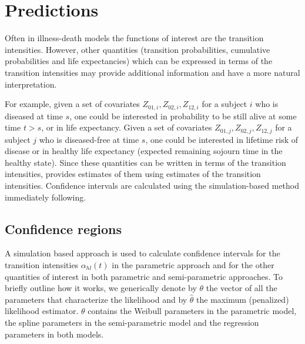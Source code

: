 \documentclass[article]{jss}
\begin{document}
\section{Predictions}
\label{sec-4}

Often in illness-death models the functions of interest are the
transition intensities.  However, other quantities (transition probabilities, cumulative probabilities and life
expectancies) which can be
expressed in terms of the transition intensities \citep{Touraine_2013}
may provide additional information and have a more natural
interpretation.

For example, given a set of covariates \(Z_{01,i},Z_{02,i},Z_{12,i}\)
for a subject \(i\) who is diseased at time \(s\), one could be interested
in probability to be still alive at some time \(t>s\), or in life
expectancy. Given a set of covariates \(Z_{01,j},Z_{02,j},Z_{12,j}\) for
a subject \(j\) who is diseased-free at time \(s\), one could be
interested in lifetime risk of disease or in healthy life expectancy
(expected remaining sojourn time in the healthy state). 
Since these quantities
can be written in terms of the transition intensities,
 provides estimates of them using estimates of the
transition intensities. Confidence intervals are
calculated using the simulation-based method immediately following.

\subsection{Confidence regions}
\label{sec-4-1}
\label{sec:CI}

A simulation based approach \citep{Mandel_2013} is used to calculate
confidence intervals for the transition intensities \(\alpha_{hl}(t)\)
in the parametric approach and for the other quantities of interest
in both parametric and semi-parametric approaches. 
To briefly outline how
it works, we generically denote by \(\theta\) the vector of all the
parameters that characterize the likelihood and by \(\hat\theta\) the
maximum (penalized) likelihood estimator.
\(\theta\) contains the Weibull parameters in the parametric model,
the spline parameters in the semi-parametric model
and the regression parameters in both models. 
\end{document}
